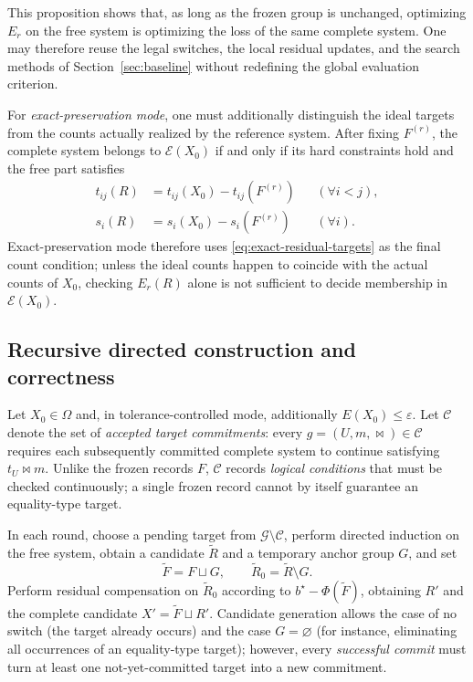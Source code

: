 \documentclass[11pt,a4paper]{article}
\numberwithin{equation}{section}
\theoremstyle{definition}
\numberwithin{algorithm}{section}
\begin{document}
This proposition shows that, as long as the frozen group is unchanged, optimizing $E_r$ on
the free system is optimizing the loss of the same complete system.
One may therefore reuse the legal switches, the local residual updates, and the search
methods of Section~\ref{sec:baseline} without redefining the global evaluation criterion.

For \emph{exact-preservation mode}, one must additionally distinguish the ideal targets from
the counts actually realized by the reference system.
After fixing $F^{(r)}$, the complete system belongs to $\mathcal E(X_0)$ if and only if its
hard constraints hold and the free part satisfies
\begin{equation}
\begin{aligned}
t_{ij}(R)&=t_{ij}(X_0)-t_{ij}(F^{(r)})&&(\forall i<j),\\
s_i(R)&=s_i(X_0)-s_i(F^{(r)})&&(\forall i).
\end{aligned}
\label{eq:exact-residual-targets}
\end{equation}
Exact-preservation mode therefore uses \eqref{eq:exact-residual-targets} as the final count
condition; unless the ideal counts happen to coincide with the actual counts of $X_0$,
checking $E_r(R)$ alone is not sufficient to decide membership in $\mathcal E(X_0)$.

\subsection{Recursive directed construction and correctness}\label{subsec:directed-algorithm}

Let $X_0\in\Omega$ and, in tolerance-controlled mode, additionally $E(X_0)\le\varepsilon$.
Let $\mathcal C$ denote the set of \emph{accepted target commitments}:
every $g=(U,m,\bowtie)\in\mathcal C$ requires each subsequently committed complete system to
continue satisfying $t_U\bowtie m$.
Unlike the frozen records $F$, $\mathcal C$ records \emph{logical conditions} that must be
checked continuously; a single frozen record cannot by itself guarantee an equality-type
target.

In each round, choose a pending target from $\mathcal G\setminus\mathcal C$, perform directed
induction on the free system, obtain a candidate $\widetilde R$ and a temporary anchor group
$G$, and set
\begin{equation}
\widetilde F=F\sqcup G,\qquad
\widetilde R_0=\widetilde R\setminus G.
\label{eq:temporary-freeze}
\end{equation}
Perform residual compensation on $\widetilde R_0$ according to
$b^\star-\Phi(\widetilde F)$, obtaining $R'$ and the complete candidate
$X'=\widetilde F\sqcup R'$.
Candidate generation allows the case of no switch (the target already occurs) and the case
$G=\varnothing$ (for instance, eliminating all occurrences of an equality-type target);
however, every \emph{successful commit} must turn at least one not-yet-committed target into
a new commitment.
\end{document}

